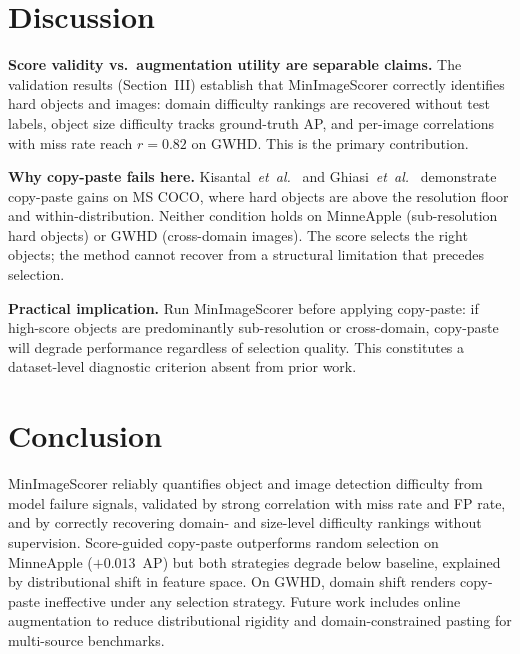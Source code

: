 \documentclass[conference]{IEEEtran}
\begin{document}
\section{Discussion}

\textbf{Score validity vs.\ augmentation utility are separable claims.}
The validation results (Section~III) establish that MinImageScorer
correctly identifies hard objects and images: domain difficulty
rankings are recovered without test labels, object size difficulty
tracks ground-truth AP, and per-image correlations with miss rate
reach $r{=}0.82$ on GWHD. This is the primary contribution.

\textbf{Why copy-paste fails here.}
Kisantal~\textit{et~al.}~\cite{kisantal2019augmentation} and
Ghiasi~\textit{et~al.}~\cite{ghiasi2021simple} demonstrate copy-paste
gains on MS COCO, where hard objects are above the resolution floor
and within-distribution. Neither condition holds on MinneApple
(sub-resolution hard objects) or GWHD (cross-domain images). The score
selects the right objects; the method cannot recover from a structural
limitation that precedes selection.

\textbf{Practical implication.}
Run MinImageScorer before applying copy-paste: if high-score objects
are predominantly sub-resolution or cross-domain, copy-paste will
degrade performance regardless of selection quality. This constitutes
a dataset-level diagnostic criterion absent from prior work.

\section{Conclusion}

MinImageScorer reliably quantifies object and image detection
difficulty from model failure signals, validated by strong correlation
with miss rate and FP rate, and by correctly recovering domain- and
size-level difficulty rankings without supervision.
Score-guided copy-paste outperforms random selection on MinneApple
($+0.013$~AP) but both strategies degrade below baseline, explained
by distributional shift in feature space. On GWHD, domain shift
renders copy-paste ineffective under any selection strategy.
Future work includes online augmentation to reduce distributional
rigidity and domain-constrained pasting for multi-source benchmarks.
\end{document}
